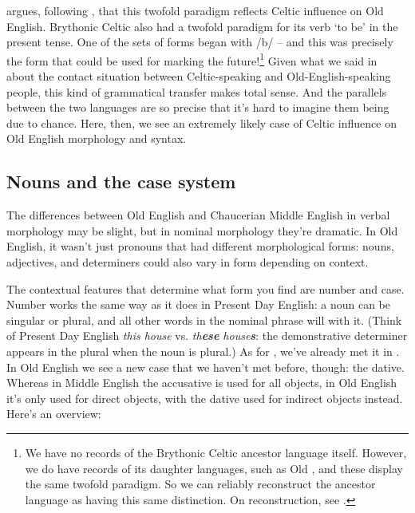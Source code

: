 \citet{Lutz2009} argues, following \citet{Keller1925}, that this twofold paradigm reflects Celtic influence on Old English. Brythonic Celtic also had a twofold paradigm for its verb `to be' in the present tense. One of the sets of forms began with /b/ -- and this was precisely the form that could be used for marking the future!\footnote{We have no records of the Brythonic Celtic ancestor language itself. However, we do have records of its daughter languages, such as Old , and these display the same twofold paradigm. So we can reliably reconstruct the ancestor language as having this same distinction. On reconstruction, see .} Given what we said in  about the contact situation between Celtic-speaking and Old-English-speaking people, this kind of grammatical transfer makes total sense. And the parallels between the two languages are so precise that it's hard to imagine them being due to chance. Here, then, we see an extremely likely case of Celtic influence on Old English morphology and syntax.

\subsection{Nouns and the case system}\label{OE-case}

The differences between Old English and Chaucerian Middle English in verbal morphology may be slight, but in nominal morphology they're dramatic. In Old English, it wasn't just pronouns that had different morphological forms: nouns, adjectives, and determiners could also vary in form depending on context.

The contextual features that determine what form you find are number and case. Number works the same way as it does in Present Day English: a noun can be singular or plural, and all other words in the nominal phrase will  with it. (Think of Present Day English \emph{this house} vs. \emph{th\textbf{ese} house\textbf{s}}: the demonstrative determiner appears in the plural when the noun is plural.) As for , we've already met it in . In Old English we see a new case that we haven't met before, though: the dative. Whereas in Middle English the accusative is used for all objects, in Old English it's only used for direct objects, with the dative used for indirect objects instead. Here's an overview:

